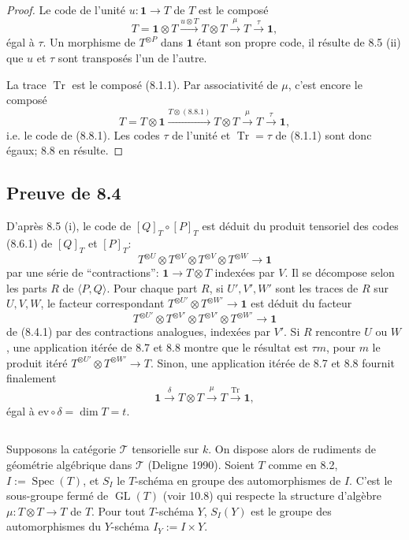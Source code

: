 \documentclass[11pt,a4paper]{article}
\theoremstyle{plain}
\theoremstyle{definition}
\DeclareMathOperator{\Spec}{Spec}
\DeclareMathOperator{\Tr}{Tr}
\DeclareMathOperator{\GL}{GL}
\newcommand{\ev}{\mathrm{ev}}
\begin{document}
\begin{proof}
Le code de l'unit\'e $u : \mathbf{1} \to T$ de $T$ est le compos\'e
\[
T = \mathbf{1} \otimes T \xrightarrow{u \otimes T} T \otimes T \xrightarrow{\mu} T \xrightarrow{\tau} \mathbf{1},
\]
\'egal \`a $\tau$. Un morphisme de $T^{\otimes P}$ dans $\mathbf{1}$ \'etant son propre code, il r\'esulte de 8.5 (ii) que $u$ et $\tau$ sont transpos\'es l'un de l'autre.

La trace $\Tr$ est le compos\'e (8.1.1). Par associativit\'e de $\mu$, c'est encore le compos\'e
\[
T = T \otimes \mathbf{1} \xrightarrow{T \otimes (8.8.1)} T \otimes T \xrightarrow{\mu} T \xrightarrow{\tau} \mathbf{1},
\]
i.e. le code de (8.8.1). Les codes $\tau$ de l'unit\'e et $\Tr = \tau$ de (8.1.1) sont donc \'egaux; 8.8 en r\'esulte.
\end{proof}

\subsection{Preuve de 8.4}
D'apr\`es 8.5 (i), le code de $[Q]_T \circ [P]_T$ est d\'eduit du produit tensoriel des codes (8.6.1) de $[Q]_T$ et $[P]_T$:
\[
T^{\otimes U} \otimes T^{\otimes V} \otimes T^{\otimes V} \otimes T^{\otimes W} \to \mathbf{1}
\]
par une s\'erie de ``contractions'': $\mathbf{1} \to T \otimes T$ index\'ees par $V$. Il se d\'ecompose selon les parts $R$ de $\langle P, Q \rangle$. Pour chaque part $R$, si $U', V', W'$ sont les traces de $R$ sur $U, V, W$, le facteur correspondant $T^{\otimes U'} \otimes T^{\otimes W'} \to \mathbf{1}$ est d\'eduit du facteur
\[
T^{\otimes U'} \otimes T^{\otimes V'} \otimes T^{\otimes V'} \otimes T^{\otimes W'} \to \mathbf{1}
\]
de (8.4.1) par des contractions analogues, index\'ees par $V'$. Si $R$ rencontre $U$ ou $W$, une application it\'er\'ee de 8.7 et 8.8 montre que le r\'esultat est $\tau m$, pour $m$ le produit it\'er\'e $T^{\otimes U'} \otimes T^{\otimes W'} \to T$. Sinon, une application it\'er\'ee de 8.7 et 8.8 fournit finalement
\[
\mathbf{1} \xrightarrow{\delta} T \otimes T \xrightarrow{\mu} T \xrightarrow{\Tr} \mathbf{1},
\]
\'egal \`a $\ev \circ \delta = \dim T = t$.

\subsection{}
Supposons la cat\'egorie $\mathcal{T}$ tensorielle sur $k$. On dispose alors de rudiments de g\'eom\'etrie alg\'ebrique dans $\mathcal{T}$ (Deligne 1990). Soient $T$ comme en 8.2, $I := \Spec(T)$, et $S_I$ le $T$-sch\'ema en groupe des automorphismes de $I$. C'est le sous-groupe ferm\'e de $\GL(T)$ (voir 10.8) qui respecte la structure d'alg\`ebre $\mu : T \otimes T \to T$ de $T$. Pour tout $T$-sch\'ema $Y$, $S_I(Y)$ est le groupe des automorphismes du $Y$-sch\'ema $I_Y := I \times Y$.
\end{document}
